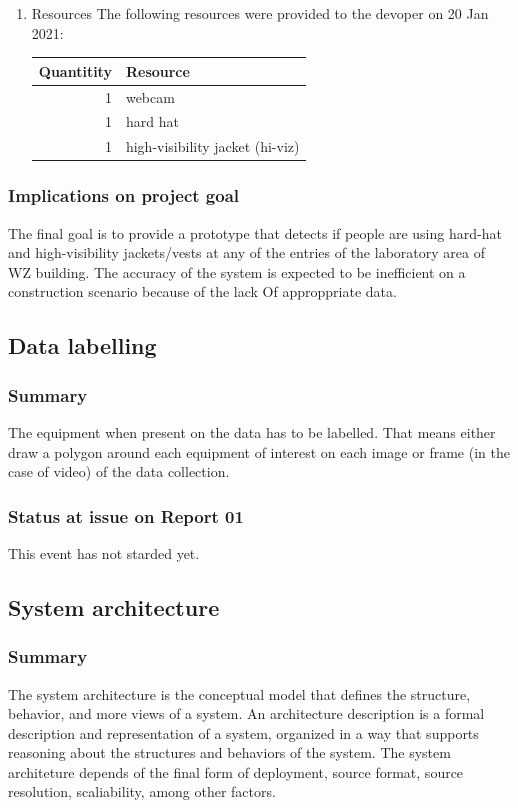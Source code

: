 \documentclass{article}
\begin{document}
\begin{enumerate}
\item Resources
\label{sec:orgeef355c}
The following resources were provided to the devoper on 20 Jan 2021:

\begin{center}
\begin{tabular}{rl}
Quantitity & Resource\\
\hline
1 & webcam\\
1 & hard hat\\
1 & high-visibility jacket (hi-viz)\\
\end{tabular}
\end{center}
\end{enumerate}

\subsubsection{Implications on project goal}
\label{sec:orgf5fcfcf}
The final goal is to provide a prototype that detects if people are using hard-hat and high-visibility jackets/vests at any of the entries of the laboratory area of WZ building.
The accuracy of the system is expected to be inefficient on a construction scenario because of the lack Of approppriate data.


\subsection{Data labelling}
\label{sec:org70456c1}
\subsubsection{Summary}
\label{sec:org966b19b}
The equipment when present on the data has to be labelled.
That means either draw a polygon around each equipment of interest on each image or frame (in the case of video) of the data collection.
\subsubsection{Status at issue on Report 01}
\label{sec:org9768f3c}
This event has not starded yet.
\subsection{System architecture}
\label{sec:orgbcff29b}
\subsubsection{Summary}
\label{sec:orga3201f5}
The system architecture is the conceptual model that defines the structure, behavior, and more views of a system.
An architecture description is a formal description and representation of a system, organized in a way that supports reasoning about the structures and behaviors of the system.
The system architeture depends of the final form of deployment, source format, source resolution, scaliability, among other factors.
\end{document}
